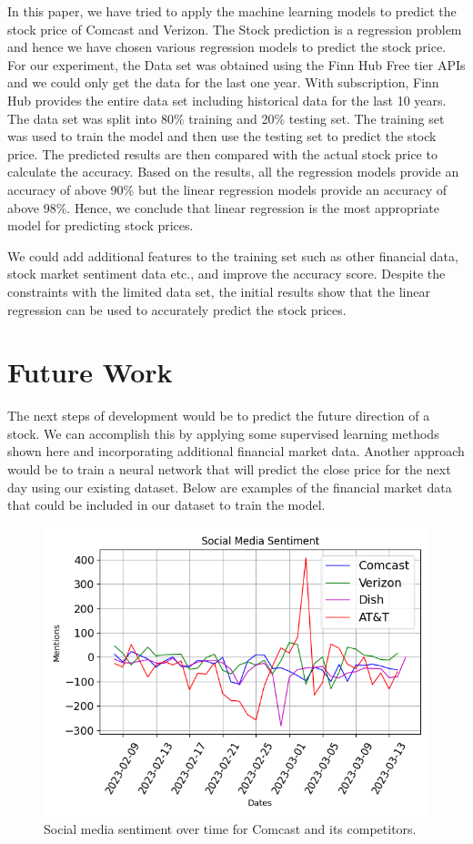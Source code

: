 \documentclass[conference]{IEEEtran}
\begin{document}
In this paper, we have tried to apply the machine learning models to predict the stock price of Comcast and Verizon.
The Stock prediction is a regression problem and hence we have chosen various regression models to predict the stock price.
For our experiment, the Data set was obtained using the Finn Hub Free tier APIs and we could only get the data for the last one year.
With subscription, Finn Hub provides the entire data set including historical data for the last 10 years. The data set was split into 80\% training and 20\% testing set.
The training set was used to train the model and then use the testing set to predict the stock price. The predicted results are then compared with the actual stock price to calculate the accuracy. Based on the results, all the regression models provide an accuracy of above 90\% but the linear regression models provide an accuracy of above 98\%.
Hence, we conclude that linear regression is the most appropriate model for predicting stock prices.\par
We could add additional features to the training set such as other financial data, stock market sentiment data etc., and improve the accuracy score. Despite the constraints with the limited data set, the initial results show that the linear regression can be used to accurately predict the stock prices.

\section{Future Work}
The next steps of development would be to predict the future direction of a stock.
We can accomplish this by applying some supervised learning methods shown here and incorporating additional financial market data.
Another approach would be to train a neural network that will predict the close price for the next day using our existing dataset. \cite{b1}
Below are examples of the financial market data that could be included in our dataset to train the model.


\begin{figure}
    \includegraphics[width=\columnwidth]{social_media_sentiment}
    \caption{Social media sentiment over time for Comcast and its competitors.}
\end{figure}
\end{document}

